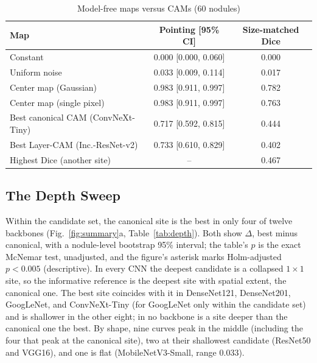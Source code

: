 \documentclass[conference]{IEEEtran}
\begin{document}
\begin{table}[t]
\caption{Model-free maps versus CAMs (60 nodules)}
\label{tab:centre}
\centering
\scriptsize
\setlength{\tabcolsep}{3pt}
\begin{tabular}{@{}lcc@{}}
\toprule
Map & Pointing [95\% CI] & Size-matched Dice \\
\midrule
Constant & 0.000 [0.000, 0.060] & 0.000 \\
Uniform noise & 0.033 [0.009, 0.114] & 0.017 \\
Center map (Gaussian) & 0.983 [0.911, 0.997] & 0.782 \\
Center map (single pixel) & 0.983 [0.911, 0.997] & 0.763 \\
\midrule
Best canonical CAM (ConvNeXt-Tiny) & 0.717 [0.592, 0.815] & 0.444 \\
Best Layer-CAM (Inc.-ResNet-v2) & 0.733 [0.610, 0.829] & 0.402 \\
Highest Dice (another site) & -- & 0.467 \\
\bottomrule
\end{tabular}
\end{table}

\subsection{The Depth Sweep}\label{sec:depthsweep}
Within the candidate set, the canonical site is the best in only four of twelve backbones (Fig.~\ref{fig:summary}a, Table~\ref{tab:depth}). Both show $\Delta$, best minus canonical, with a nodule-level bootstrap 95\% interval; the table's $p$ is the exact McNemar test, unadjusted, and the figure's asterisk marks Holm-adjusted $p<0.005$ (descriptive). In every CNN the deepest candidate is a collapsed $1\times1$ site, so the informative reference is the deepest site with spatial extent, the canonical one. The best site coincides with it in DenseNet121, DenseNet201, GoogLeNet, and ConvNeXt-Tiny (for GoogLeNet only within the candidate set) and is shallower in the other eight; in no backbone is a site deeper than the canonical one the best. By shape, nine curves peak in the middle (including the four that peak at the canonical site), two at their shallowest candidate (ResNet50 and VGG16), and one is flat (MobileNetV3-Small, range 0.033).
\end{document}
